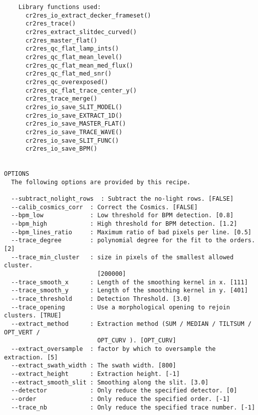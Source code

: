 \begin{verbatim}
    Library functions used:                                               
      cr2res_io_extract_decker_frameset()                                 
      cr2res_trace()                                                      
      cr2res_extract_slitdec_curved()                                     
      cr2res_master_flat()                                                
      cr2res_qc_flat_lamp_ints()                                          
      cr2res_qc_flat_mean_level()                                         
      cr2res_qc_flat_mean_med_flux()                                      
      cr2res_qc_flat_med_snr()                                            
      cr2res_qc_overexposed()                                             
      cr2res_qc_flat_trace_center_y()                                     
      cr2res_trace_merge()                                                
      cr2res_io_save_SLIT_MODEL()                                         
      cr2res_io_save_EXTRACT_1D()                                         
      cr2res_io_save_MASTER_FLAT()                                        
      cr2res_io_save_TRACE_WAVE()                                         
      cr2res_io_save_SLIT_FUNC()                                          
      cr2res_io_save_BPM()                                                
  

OPTIONS
  The following options are provided by this recipe.

  --subtract_nolight_rows  : Subtract the no-light rows. [FALSE]
  --calib_cosmics_corr  : Correct the Cosmics. [FALSE]
  --bpm_low             : Low threshold for BPM detection. [0.8]
  --bpm_high            : High threshold for BPM detection. [1.2]
  --bpm_lines_ratio     : Maximum ratio of bad pixels per line. [0.5]
  --trace_degree        : polynomial degree for the fit to the orders. [2]
  --trace_min_cluster   : size in pixels of the smallest allowed cluster.
                          [200000]
  --trace_smooth_x      : Length of the smoothing kernel in x. [111]
  --trace_smooth_y      : Length of the smoothing kernel in y. [401]
  --trace_threshold     : Detection Threshold. [3.0]
  --trace_opening       : Use a morphological opening to rejoin clusters. [TRUE]
  --extract_method      : Extraction method (SUM / MEDIAN / TILTSUM / OPT_VERT /
                          OPT_CURV ). [OPT_CURV]
  --extract_oversample  : factor by which to oversample the extraction. [5]
  --extract_swath_width : The swath width. [800]
  --extract_height      : Extraction height. [-1]
  --extract_smooth_slit : Smoothing along the slit. [3.0]
  --detector            : Only reduce the specified detector. [0]
  --order               : Only reduce the specified order. [-1]
  --trace_nb            : Only reduce the specified trace number. [-1]

\end{verbatim}
